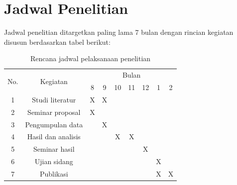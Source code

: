 \section[Jadwal Penelitian]{Jadwal Penelitian}
\begin{spacing}{1.5}
	Jadwal penelitian ditargetkan paling lama 7 bulan dengan rincian kegiatan disusun berdasarkan tabel berikut:
	\begin{table}[htp]
		\centering
		\caption{Rencana jadwal pelaksanaan penelitian}
		\label{table:jadwal}
		\begin{tabular}{|c|c|ccccccc|}
			\hline
			\multirow{2}{*}{No.} & \multirow{2}{*}{Kegiatan} & \multicolumn{7}{c|}{Bulan}                                                                                                                            \\ \cline{3-9} 
			&                   & \multicolumn{1}{c|}{8} & \multicolumn{1}{c|}{9} & \multicolumn{1}{c|}{10} & \multicolumn{1}{c|}{11} & \multicolumn{1}{c|}{12} & \multicolumn{1}{c|}{1} &  2 \\ \hline 1
			& Studi literatur   & \multicolumn{1}{c|}{X} & \multicolumn{1}{c|}{X} & \multicolumn{1}{c|}{} & \multicolumn{1}{c|}{} & \multicolumn{1}{c|}{} & \multicolumn{1}{c|}{} &  \\ \hline 2
			& Seminar proposal    & \multicolumn{1}{c|}{X} & \multicolumn{1}{c|}{} & \multicolumn{1}{c|}{} & \multicolumn{1}{c|}{} & \multicolumn{1}{c|}{} & \multicolumn{1}{c|}{} &  \\ \hline 3
			& Pengumpulan data    & \multicolumn{1}{c|}{} & \multicolumn{1}{c|}{X} & \multicolumn{1}{c|}{} & \multicolumn{1}{c|}{} & \multicolumn{1}{c|}{} & \multicolumn{1}{c|}{} &  \\ \hline 4
			& Hasil dan analisis  & \multicolumn{1}{c|}{} & \multicolumn{1}{c|}{} & \multicolumn{1}{c|}{X} & \multicolumn{1}{c|}{X} & \multicolumn{1}{c|}{} & \multicolumn{1}{c|}{} &  \\ \hline 5
			& Seminar hasil       & \multicolumn{1}{c|}{} & \multicolumn{1}{c|}{} & \multicolumn{1}{c|}{} & \multicolumn{1}{c|}{} & \multicolumn{1}{c|}{X} & \multicolumn{1}{c|}{} &  \\ \hline 6
			& Ujian sidang        & \multicolumn{1}{c|}{} & \multicolumn{1}{c|}{} & \multicolumn{1}{c|}{} & \multicolumn{1}{c|}{} & \multicolumn{1}{c|}{} & \multicolumn{1}{c|}{X} &  \\ \hline 7
			& Publikasi           & \multicolumn{1}{c|}{} & \multicolumn{1}{c|}{} & \multicolumn{1}{c|}{} & \multicolumn{1}{c|}{} & \multicolumn{1}{c|}{} & \multicolumn{1}{c|}{X} & X  \\ \hline 
		\end{tabular}
	\end{table}

\end{spacing}